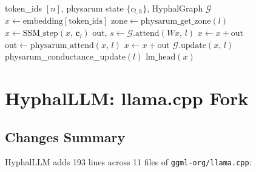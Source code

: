 \documentclass[11pt]{article}
\begin{document}
\begin{algorithm}[H]
\caption{PhysarumFormer forward pass}
\begin{algorithmic}[1]
\Require token\_ids $[n]$, physarum state $\{c_{l,h}\}$, HyphalGraph $\mathcal{G}$
\State $x \leftarrow \text{embedding}[\text{token\_ids}]$  
  \State $\text{zone} \leftarrow \text{physarum\_get\_zone}(l)$
    \State $x \leftarrow \text{SSM\_step}(x,\, \mathbf{c}_l)$  
    \State $\text{out},\, s \leftarrow \mathcal{G}\text{.attend}(Wx,\, l)$  
    \State $x \leftarrow x + \text{out}$
  \Else {}
    \State $\text{out} \leftarrow \text{physarum\_attend}(x,\, l)$  
    \State $x \leftarrow x + \text{out}$
    \State $\mathcal{G}\text{.update}(x,\, l)$
  \EndIf
  \State physarum\_conductance\_update$(l)$
\EndFor
\State \Return $\text{lm\_head}(x)$  
\end{algorithmic}
\end{algorithm}

\section{HyphalLLM: llama.cpp Fork}
\label{sec:fork}

\subsection{Changes Summary}

HyphalLLM adds 193 lines across 11 files of \texttt{ggml-org/llama.cpp}:
\end{document}
